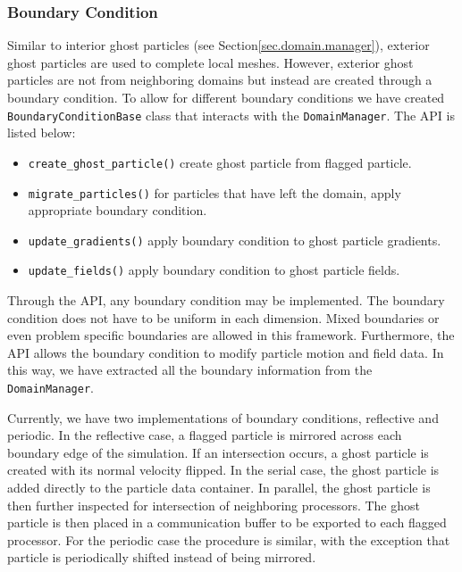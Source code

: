 \subsubsection{Boundary Condition}
Similar to interior ghost particles (see Section\ref{sec.domain.manager}), exterior ghost particles
are used to complete local meshes. However, exterior ghost particles are not from neighboring
domains but instead are created through a boundary condition. To allow for different
boundary conditions we have created \lstinline{BoundaryConditionBase} class that interacts
with the \lstinline{DomainManager}. The API is listed below:
\begin{itemize}
	\item \lstinline{create_ghost_particle()} create ghost particle from flagged particle.
    \item \lstinline{migrate_particles()} for particles that have left the domain, apply
    appropriate boundary condition.
    \item \lstinline{update_gradients()} apply boundary condition to ghost particle gradients.
    \item \lstinline{update_fields()} apply boundary condition to ghost particle fields.
\end{itemize}
Through the API, any boundary condition may be implemented. The boundary condition does not have
to be uniform in each dimension. Mixed boundaries or even problem specific boundaries are allowed
in this framework. Furthermore, the API allows the boundary condition to modify particle motion and
field data. In this way, we have extracted all the boundary information from the 
\lstinline{DomainManager}.

Currently, we have two implementations of boundary conditions, reflective and periodic.
In the reflective case, a flagged particle is mirrored across each boundary edge of the
simulation. If an intersection occurs, a ghost particle is created with its normal velocity flipped.
In the serial case, the ghost particle is added directly to the particle data container. In parallel, the 
ghost particle is then further inspected for intersection of neighboring processors. The ghost particle
is then placed in a communication buffer to be exported to each flagged processor. For the periodic case
the procedure is similar, with the exception that particle is periodically shifted
instead of being mirrored.

